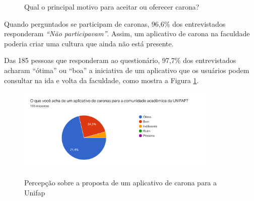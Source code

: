 \begin{figure}[H]
	
	\center
	\qquad
	\caption{Qual o principal motivo para aceitar ou oferecer carona?}
	
\end{figure}



Quando perguntados se participam de caronas, 96,6\% dos entrevistados responderam \textit{“Não participavam”}. Assim, um aplicativo de carona na faculdade poderia criar uma cultura que ainda não está presente.

Das 185 pessoas que responderam ao questionário, 97,7\% dos entrevistados acharam “ótima” ou “boa” a iniciativa de um aplicativo que os usuários podem consultar na ida e volta da faculdade, como mostra a Figura \ref{fig:percepcao}.

\begin{figure}[!hbtp]
	\centering
	\caption{Percepção sobre a proposta de um aplicativo de carona para a Unifap}
	\includegraphics[width=0.85\textwidth]{./04-figuras/questionario/15.png}
	\label{fig:percepcao}
\end{figure}


